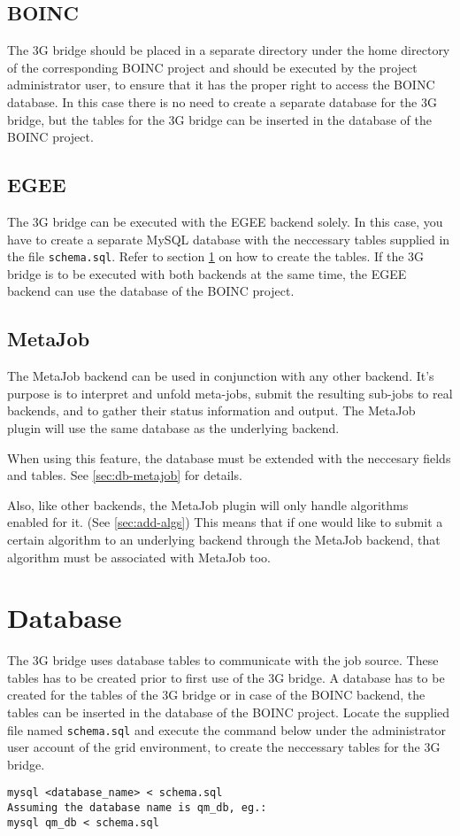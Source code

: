 \documentclass[a4paper, 12pt]{article}
\begin{document}
\subsection{BOINC}
The 3G bridge should be placed in a separate directory under the home directory of the corresponding BOINC project and should be executed by the project administrator user, to ensure that it has the proper right to access the BOINC database. In this case there is no need to create a separate database for the 3G bridge, but the tables for the 3G bridge can be inserted in the database of the BOINC project.

\subsection{EGEE}
The 3G bridge can be executed with the EGEE backend solely. In this case, you have to create a separate MySQL database with the neccessary tables supplied in the file {\tt schema.sql}. Refer to section \ref{sec:db} on how to create the tables. If the 3G bridge is to be executed with both backends at the same time, the EGEE backend can use the database of the BOINC project.

\subsection{MetaJob}

The MetaJob backend can be used in conjunction with any other backend. It's
purpose is to interpret and unfold meta-jobs, submit the resulting sub-jobs to
real backends, and to gather their status information and output. The MetaJob
plugin will use the same database as the underlying backend.

When using this feature, the database must be extended with the neccesary fields
and tables. See \ref{sec:db-metajob} for details.

Also, like other backends, the MetaJob plugin will only handle algorithms
enabled for it. (See \ref{sec:add-algs}) This means that if one would like to
submit a certain algorithm to an underlying backend through the MetaJob backend,
that algorithm must be associated with MetaJob too.

\section{Database}
\label{sec:db}

The 3G bridge uses database tables to communicate with the job source. These tables has to be created prior to first use of the 3G bridge. A database has to be created for the tables of the 3G bridge or in case of the BOINC backend, the tables can be inserted in the database of the BOINC project. Locate the supplied file named {\tt schema.sql} and execute the command below under the administrator user account of the grid environment, to create the neccessary tables for the 3G bridge.
\begin{verbatim}
mysql <database_name> < schema.sql
Assuming the database name is qm_db, eg.:
mysql qm_db < schema.sql
\end{verbatim}
\end{document}
